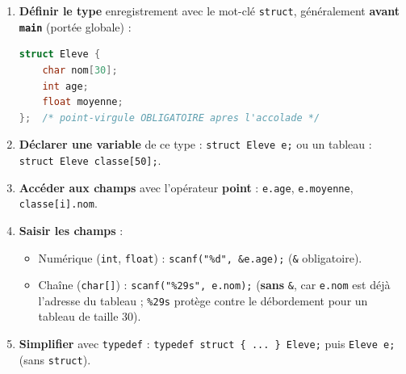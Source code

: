 \documentclass[11pt]{article}
\begin{document}
\begin{methode}
\begin{enumerate}
\item \textbf{Définir le type} enregistrement avec le mot-clé \texttt{struct}, généralement \textbf{avant \texttt{main}} (portée globale) :
\begin{lstlisting}[language=C]
struct Eleve {
    char nom[30];
    int age;
    float moyenne;
};  /* point-virgule OBLIGATOIRE apres l'accolade */
\end{lstlisting}
\item \textbf{Déclarer une variable} de ce type : \texttt{struct Eleve e;} ou un tableau : \texttt{struct Eleve classe[50];}.
\item \textbf{Accéder aux champs} avec l'opérateur \textbf{point} : \texttt{e.age}, \texttt{e.moyenne}, \texttt{classe[i].nom}.
\item \textbf{Saisir les champs} :
\begin{itemize}
\item Numérique (\texttt{int}, \texttt{float}) : \texttt{scanf("\%d", \&e.age);} (\texttt{\&} obligatoire).
\item Chaîne (\texttt{char[]}) : \texttt{scanf("\%29s", e.nom);} (\textbf{sans} \texttt{\&}, car \texttt{e.nom} est déjà l'adresse du tableau ; \texttt{\%29s} protège contre le débordement pour un tableau de taille 30).
\end{itemize}
\item \textbf{Simplifier} avec \texttt{typedef} : \texttt{typedef struct \{ ... \} Eleve;} puis \texttt{Eleve e;} (sans \texttt{struct}).
\end{enumerate}
\end{methode}
\end{document}
